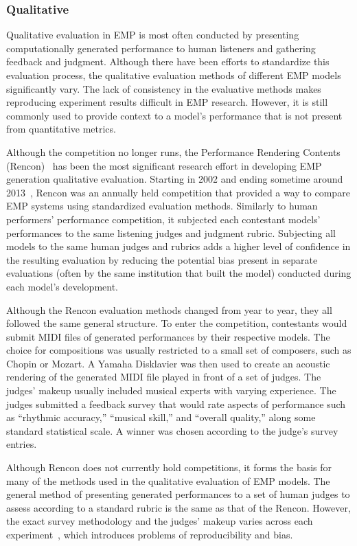 \subsubsection{Qualitative}
Qualitative evaluation in EMP is most often conducted by presenting computationally generated performance to human listeners and gathering feedback and judgment. Although there have been efforts to standardize this evaluation process, the qualitative evaluation methods of different EMP models significantly vary. The lack of consistency in the evaluative methods makes reproducing experiment results difficult in EMP research. However, it is still commonly used to provide context to a model's performance that is not present from quantitative metrics.

Although the competition no longer runs, the Performance Rendering Contents (Rencon)~\cite{katayose2012evaluating} has been the most significant research effort in developing EMP generation qualitative evaluation. Starting in 2002 and ending sometime around 2013~\cite{cancino2018computational}, Rencon was an annually held competition that provided a way to compare EMP systems using standardized evaluation methods. Similarly to human performers' performance competition, it subjected each contestant models' performances to the same listening judges and judgment rubric. Subjecting all models to the same human judges and rubrics adds a higher level of confidence in the resulting evaluation by reducing the potential bias present in separate evaluations (often by the same institution that built the model) conducted during each model's development.

Although the Rencon evaluation methods changed from year to year, they all followed the same general structure. To enter the competition, contestants would submit MIDI files of generated performances by their respective models. The choice for compositions was usually restricted to a small set of composers, such as Chopin or Mozart. A Yamaha Disklavier was then used to create an acoustic rendering of the generated MIDI file played in front of a set of judges. The judges' makeup usually included musical experts with varying experience. The judges submitted a feedback survey that would rate aspects of performance such as ``rhythmic accuracy,'' ``musical skill,'' and ``overall quality,'' along some standard statistical scale. A winner was chosen according to the judge's survey entries. 

Although Rencon does not currently hold competitions, it forms the basis for many of the methods used in the qualitative evaluation of EMP models. The general method of presenting generated performances to a set of human judges to assess according to a standard rubric is the same as that of the Rencon. However, the exact survey methodology and the judges' makeup varies across each experiment~\cite{jeong2019virtuosonet, schubert2017algorithms}, which introduces problems of reproducibility and bias. 

